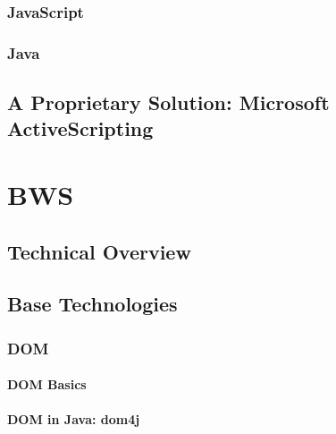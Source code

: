   \subsection{JavaScript}
   
   
    
  \subsection{Java}
  
   
    
  \section{A Proprietary Solution: Microsoft ActiveScripting}
  \label{sec:activescripting}
    
   
     
\chapter{BWS}

 

 \section{Technical Overview}
  
  
  
 \section{Base Technologies}
 \label{sec:BaseTechnologies}
  
  
  
  \subsection{DOM}
  
   
   
   \subsubsection{DOM Basics}
   
    
    
   \subsubsection{DOM in Java: dom4j}
    
